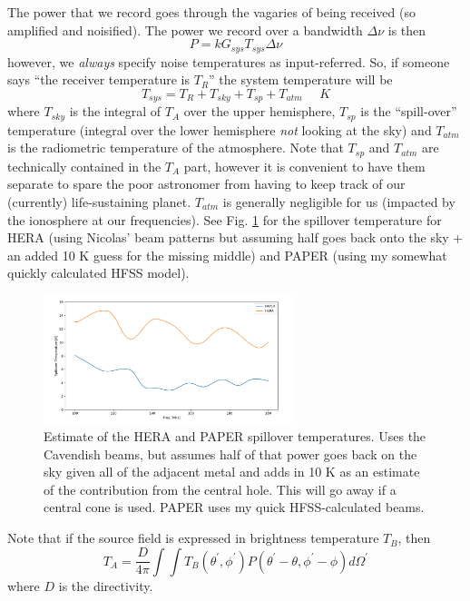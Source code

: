 \documentclass[11pt]{article}
\begin{document}
The power that we record goes through the vagaries of being received (so amplified and noisified).  The power we record over a bandwidth $\Delta\nu$ is then
\begin{equation}
P = kG_{sys}T_{sys}\Delta\nu
\end{equation}
however, we {\em always} specify noise temperatures as input-referred.  So, if someone says ``the receiver temperature is $T_R$''
the system temperature will be 
\begin{equation}
T_{sys} = T_R + T_{sky} + T_{sp} + T_{atm} ~~~~~~K 
\end{equation}
where $T_{sky}$ is the integral of $T_A$ over the upper hemisphere, $T_{sp}$ is the ``spill-over'' temperature (integral over the lower hemisphere {\em not} looking at the sky) and $T_{atm}$ is the radiometric temperature of the atmosphere.  Note that $T_{sp}$ and $T_{atm}$ are technically contained in the $T_A$ part, however it is convenient to have them separate to spare the poor astronomer from having to keep track of our (currently) life-sustaining planet.  $T_{atm}$ is generally negligible for us (impacted by the ionosphere at our frequencies).  See Fig. \ref{Fig:Tspill} for the spillover temperature for HERA (using Nicolas' beam patterns but assuming half goes back onto the sky + an added 10 K guess for the missing middle) and PAPER (using my somewhat quickly calculated HFSS model).

\begin{figure}[ht]
\centering
\includegraphics[width=0.65\textwidth]{spillover.png}
\caption{\small Estimate of the HERA and PAPER spillover temperatures.  Uses the Cavendish beams, but assumes half of that power goes back on the sky given all of the adjacent metal and adds in 10 K as an estimate of the contribution from the central hole.  This will go away if a central cone is used.  PAPER uses my quick HFSS-calculated beams.}
\label{Fig:Tspill}
\end{figure}

Note that if the source field is expressed in brightness temperature $T_B$, then
\begin{equation}
\label{Eq:TA}
T_A =  \frac{D}{4\pi}\int \int T_B(\theta^\prime,\phi^\prime)P(\theta^\prime-\theta,\phi^\prime-\phi)d\Omega^\prime
\end{equation}
where $D$ is the directivity.
\end{document}
